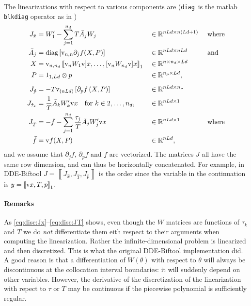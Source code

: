 \documentclass[11pt]{scrartcl}
\newcommand{\mlvar}[1]{\lstinline[keywordstyle=\color{var}]!#1!}
\newcommand{\blist}[1]{\mbox{\lstinline!#1!}}
\newcommand{\R}{\mathbb{R}}
\renewcommand{\vec}{\blist{v}}
\newcommand{\diag}{\mbox{\mlvar{diag}}}
\newcommand{\llb}{\left\llbracket}
\newcommand{\rrb}{\right\rrbracket}
\begin{document}
The linearizations with respect to various components are (\diag\, is
the matlab \blist{blkdiag} operator as in \cite{HS13})
\begin{align}
  \label{eq:disc:Jx}
  J_{\hat x}&=W'_1-\sum_{j=1}^{n_d}T\bar A_jW_j&&\in\R^{nLd\times n(Ld+1)}&&\mbox{ where}\\
  \bar A_j&=\diag\left[\vec_{n,n}\partial_jf(X,P)\right]
  &&\in\R^{nLd\times nLd}&&\mbox{ and}\nonumber\\
  X &= \vec_{n,n_d}\llb\vec_nW_1\vec] x,\ldots,[\vec_nW_{n_d}\vec]
  x\rrb_1 &&
  \in\R^{n\times n_d\times Ld} \nonumber\\
  P&=1_{1,Ld}\otimes p&& \in\R^{n_p\times Ld}\mbox{,}\nonumber\\[1ex]
  \label{eq:disc:Jp}
  J_{\hat p}&=-T\vec_{(nLd)}\left[
    \partial_pf\left(X,P\right)\right]
  &&\in\R^{nLd\times n_p}\\
  \label{eq:disc:Jtau}
  J_{\hat \tau_k}&=\frac{1}{T}\bar A_kW'_k\vec x\mbox{\quad for $k\in{2,\ldots,n_d}$,}&&\in \R^{nLd\times 1}
  \\
  \label{eq:disc:JT}
  J_{\hat T}&=-\bar f-\sum_{j=1}^{n_d}\frac{\tau_j}{T}\bar A_jW'_j\vec x
  &&\in \R^{nLd\times 1}&&\mbox{ where}\\
  \bar f&=\vec f(X,P) &&\in\R^{nLd}\mbox{,}\nonumber
\end{align}
and we assume that $\partial_jf$, $\partial_pf$ and $f$ are
vectorized. The matrices $J$ all have the same row dimension, and can
thus be horizontally concatenated. For example, in DDE-Biftool
$J=\llb J_{\hat x},J_{\hat T},J_{\hat p}\rrb$ is the order since the variable
in the continuation is $y=\llb\vec x,T,p\rrb_1$.

\paragraph{Remarks} As \eqref{eq:disc:Jx}--\eqref{eq:disc:JT} shows,
even though the $W$ matrices are functions of $\tau_k$ and $T$ we do
\emph{not} differentiate them eith respect to their arguments when
computing the linearization. Rather the infinite-dimensional problem
is linearized and then discretized. This is what the original
DDE-Biftool implementation did.  A good reason is that a
differentiation of $W(\theta)$ with respect to $\theta$ will always be
discontinuous at the collocation interval boundaries: it will suddenly
depend on other variables. However, the derivative of the
discretization of the linearization with repect to $\tau$ or $T$ may
be continuous if the piecewise polynomial is sufficiently regular.

  
\end{document}
